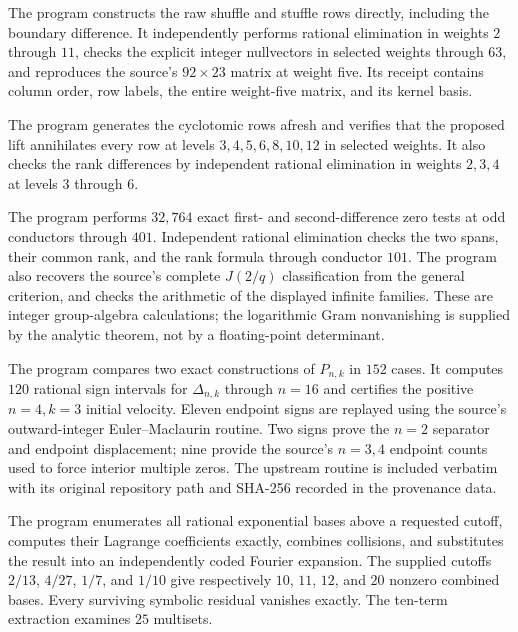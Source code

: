 \begin{description}[style=nextline,leftmargin=0pt,labelwidth=0pt,labelsep=0pt]
\item[Gaussian ranks.]
The program  constructs the raw
shuffle and stuffle rows directly, including the boundary difference.
It independently performs rational elimination in weights $2$ through
$11$, checks the explicit integer nullvectors in selected weights
through $63$, and reproduces the source's $92\times23$ matrix at
weight five. Its receipt contains column order, row labels, the entire
weight-five matrix, and its kernel basis.

\item[Universal lift.]
The program  generates the
cyclotomic rows afresh and verifies that the proposed lift annihilates
every row at levels $3,4,5,6,8,10,12$ in selected weights. It also
checks the rank differences by independent rational elimination in
weights $2,3,4$ at levels $3$ through $6$.

\item[Herglotz symbol calculations.]
The program  performs $32{,}764$ exact
first- and second-difference zero tests at odd conductors through $401$.
Independent rational elimination checks the two spans, their common
rank, and the rank formula through conductor $101$. The program also
recovers the source's complete $J(2/q)$ classification from the general
criterion, and checks the arithmetic of the displayed infinite families.
These are integer group-algebra calculations; the logarithmic Gram
nonvanishing is supplied by the analytic theorem, not by a floating-point
determinant.

\item[Lerch polynomial identities and endpoint certificates.]
The program  compares two exact
constructions of $P_{n,k}$ in $152$ cases. It computes $120$ rational
sign intervals for $\Delta_{n,k}$ through $n=16$ and certifies the
positive $n=4,k=3$ initial velocity. Eleven endpoint signs are replayed
using the source's outward-integer Euler--Maclaurin routine. Two signs
prove the $n=2$ separator and endpoint displacement; nine provide the
source's $n=3,4$ endpoint counts used to force interior multiple zeros.
The upstream routine is included verbatim with its original repository
path and SHA-256 recorded in the provenance data.

\item[Angular coefficients.]
The program  enumerates all rational
exponential bases above a requested cutoff, computes their Lagrange
coefficients exactly, combines collisions, and substitutes the result
into an independently coded Fourier expansion. The supplied cutoffs
$2/13$, $4/27$, $1/7$, and $1/10$ give respectively $10$, $11$, $12$,
and $20$ nonzero combined bases. Every surviving symbolic residual
vanishes exactly. The ten-term extraction examines $25$ multisets.


\end{description}
